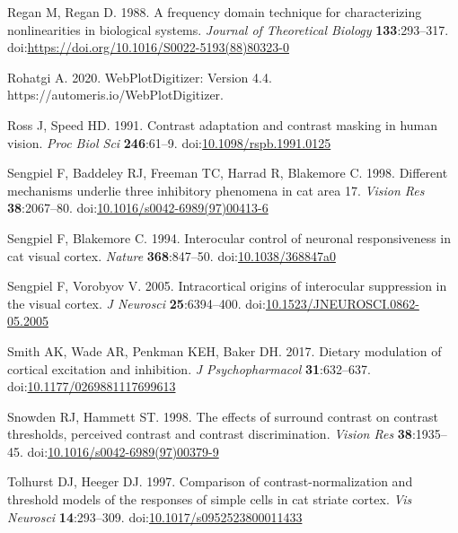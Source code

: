 \documentclass[]{article}
\begin{document}
\leavevmode\hypertarget{ref-Regan1988}{}%
Regan M, Regan D. 1988. A frequency domain technique for characterizing nonlinearities in biological systems. \emph{Journal of Theoretical Biology} \textbf{133}:293--317. doi:\href{https://doi.org/https://doi.org/10.1016/S0022-5193(88)80323-0}{https://doi.org/10.1016/S0022-5193(88)80323-0}

\leavevmode\hypertarget{ref-Rohatgi2020}{}%
Rohatgi A. 2020. WebPlotDigitizer: Version 4.4. https://automeris.io/WebPlotDigitizer.

\leavevmode\hypertarget{ref-Ross1991}{}%
Ross J, Speed HD. 1991. Contrast adaptation and contrast masking in human vision. \emph{Proc Biol Sci} \textbf{246}:61--9. doi:\href{https://doi.org/10.1098/rspb.1991.0125}{10.1098/rspb.1991.0125}

\leavevmode\hypertarget{ref-Sengpiel1998}{}%
Sengpiel F, Baddeley RJ, Freeman TC, Harrad R, Blakemore C. 1998. Different mechanisms underlie three inhibitory phenomena in cat area 17. \emph{Vision Res} \textbf{38}:2067--80. doi:\href{https://doi.org/10.1016/s0042-6989(97)00413-6}{10.1016/s0042-6989(97)00413-6}

\leavevmode\hypertarget{ref-Sengpiel1994}{}%
Sengpiel F, Blakemore C. 1994. Interocular control of neuronal responsiveness in cat visual cortex. \emph{Nature} \textbf{368}:847--50. doi:\href{https://doi.org/10.1038/368847a0}{10.1038/368847a0}

\leavevmode\hypertarget{ref-Sengpiel2005}{}%
Sengpiel F, Vorobyov V. 2005. Intracortical origins of interocular suppression in the visual cortex. \emph{J Neurosci} \textbf{25}:6394--400. doi:\href{https://doi.org/10.1523/JNEUROSCI.0862-05.2005}{10.1523/JNEUROSCI.0862-05.2005}

\leavevmode\hypertarget{ref-Smith2017}{}%
Smith AK, Wade AR, Penkman KEH, Baker DH. 2017. Dietary modulation of cortical excitation and inhibition. \emph{J Psychopharmacol} \textbf{31}:632--637. doi:\href{https://doi.org/10.1177/0269881117699613}{10.1177/0269881117699613}

\leavevmode\hypertarget{ref-Snowden1998}{}%
Snowden RJ, Hammett ST. 1998. The effects of surround contrast on contrast thresholds, perceived contrast and contrast discrimination. \emph{Vision Res} \textbf{38}:1935--45. doi:\href{https://doi.org/10.1016/s0042-6989(97)00379-9}{10.1016/s0042-6989(97)00379-9}

\leavevmode\hypertarget{ref-Tolhurst1997}{}%
Tolhurst DJ, Heeger DJ. 1997. Comparison of contrast-normalization and threshold models of the responses of simple cells in cat striate cortex. \emph{Vis Neurosci} \textbf{14}:293--309. doi:\href{https://doi.org/10.1017/s0952523800011433}{10.1017/s0952523800011433}
\end{document}
